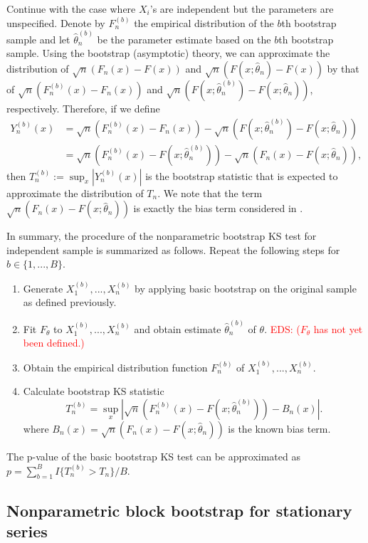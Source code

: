 \documentclass[APA,Times1COL]{WileyNJDv5} %
\newcommand{\eds}[1]{\textcolor{red}{EDS: (#1)}}
\begin{document}
Continue with the case where $X_i$'s are independent but the parameters
are unspecified. Denote by
$F^{(b)}_n$ the empirical distribution of the $b$th bootstrap sample and let
$\hat\theta^{(b)}_n$ be the parameter estimate based on the $b$th bootstrap 
sample. 
Using the bootstrap (asymptotic) theory, we can approximate the distribution of
$\sqrt{n}(F_n(x) - F(x))$ and $\sqrt{n}(F(x; \hat\theta_n) - F(x))$
by that of $\sqrt{n}(F^{(b)}_n(x) - F_n(x))$ and
$\sqrt{n}(F(x; \hat\theta^{(b)}_n) - F(x; \hat\theta_n))$, respectively.
Therefore, if we define
\begin{align*}
Y^{(b)}_n(x) &= \sqrt{n}(F^{(b)}_n(x) - F_n(x)) - 
               \sqrt{n}(F(x; \hat\theta^{(b)}_n) - F(x; \hat\theta_n)) \\
             &= \sqrt{n}(F^{(b)}_n(x) - F(x; \hat\theta^{(b)}_n)) - 
               \sqrt{n}(F_n(x) - F(x; \hat\theta_n)),
\end{align*}
then $T^{(b)}_n := \sup_x|Y^{(b)}_n(x)|$ is the bootstrap statistic that is 
expected to approximate the distribution of $T_n$. We note that the term
$\sqrt{n}(F_n(x) - F(x; \hat\theta_n))$ is exactly the bias term considered in 
\citet{babu2004goodness}.


In summary, the procedure of the nonparametric bootstrap KS test for independent
sample is 
summarized as follows. Repeat the following steps for $b \in \{1, ..., B\}$.
\begin{enumerate}
\item
  Generate $X^{(b)}_1,...,X^{(b)}_n$ by applying basic bootstrap 
  on the original sample as
  defined previously.
\item
  Fit $F_\theta$ to $X^{(b)}_1,...,X^{(b)}_n$ and obtain estimate 
	$\hat\theta^{(b)}_n$ of $\theta$.  
	\eds{$F_\theta$ has not yet been defined.}
\item
  Obtain the empirical distribution function $F^{(b)}_n$ of
  $X^{(b)}_1,...,X^{(b)}_n$. 
\item
  Calculate bootstrap KS statistic
  \[
    T^{(b)}_n = \sup_x | \sqrt{n}\left(F^{(b)}_n(x) 
    - F(x; \hat\theta^{(b)}_n)\right) - B_n(x) |.
  \]
  where 
  $B_{n}(x) = \sqrt{n}(F_n(x) - F(x; \hat\theta_n))$ is the known
  bias term.
\end{enumerate}


The p-value of the basic bootstrap KS test can be approximated
as $p = \sum_{b=1}^B I\{T^{(b)}_n > T_n\} / B$.


\subsection{Nonparametric block bootstrap for stationary series}
\end{document}
